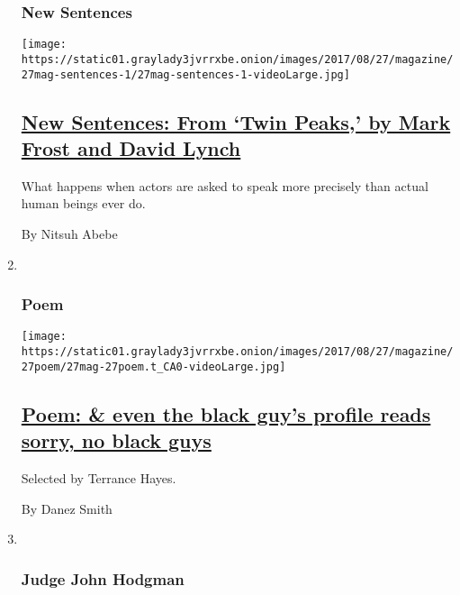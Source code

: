 \begin{enumerate}
{  \subsubsection{New Sentences}\label{new-sentences}}

  \texttt{[image: https://static01.graylady3jvrrxbe.onion/images/2017/08/27/magazine/27mag-sentences-1/27mag-sentences-1-videoLarge.jpg]}

  \hypertarget{new-sentences-from-twin-peaks-by-mark-frost-and-david-lynch}{%
  \subsection{\texorpdfstring{\href{/2017/08/25/magazine/new-sentences-from-twin-peaks-by-mark-frost-and-david-lynch.html}{New
  Sentences: From `Twin Peaks,' by Mark Frost and David
  Lynch}}{New Sentences: From `Twin Peaks,' by Mark Frost and David Lynch}}\label{new-sentences-from-twin-peaks-by-mark-frost-and-david-lynch}}

  What happens when actors are asked to speak more precisely than actual
  human beings ever do.

  By Nitsuh Abebe
\item ~
  \hypertarget{poem}{%
  \subsubsection{Poem}\label{poem}}

  \texttt{[image: https://static01.graylady3jvrrxbe.onion/images/2017/08/27/magazine/27poem/27mag-27poem.t\_CA0-videoLarge.jpg]}

  \hypertarget{poem--even-the-black-guys-profile-reads-sorry-no-black-guys}{%
  \subsection{\texorpdfstring{\href{/2017/08/25/magazine/poem-even-the-black-guys-profile-reads-sorry-no-black-guys.html}{Poem:
  \& even the black guy's profile reads sorry, no black
  guys}}{Poem: \& even the black guy's profile reads sorry, no black guys}}\label{poem--even-the-black-guys-profile-reads-sorry-no-black-guys}}

  Selected by Terrance Hayes.

  By Danez Smith
\item ~
  \hypertarget{judge-john-hodgman}{%
  \subsubsection{Judge John Hodgman}\label{judge-john-hodgman}}


\end{enumerate}
